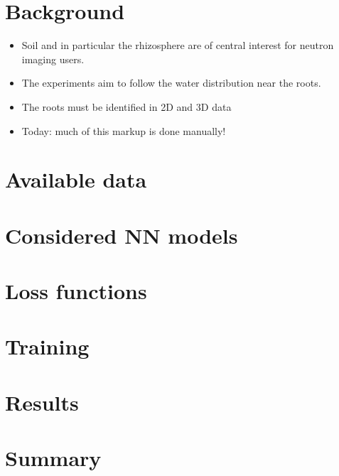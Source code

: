 \documentclass[letterpaper,10pt,english]{sphinxmanual}
\begin{document}
\section{Background}
\label{\detokenize{ML4NeutronImageSegmentation:background}}\begin{itemize}
\item {} 
Soil and in particular the rhizosphere are of central interest for neutron imaging users.

\item {} 
The experiments aim to follow the water distribution near the roots.

\item {} 
The roots must be identified in 2D and 3D data

\item {} 
Today: much of this mark\sphinxhyphen{}up is done manually!

\end{itemize}


\section{Available data}
\label{\detokenize{ML4NeutronImageSegmentation:available-data}}

\section{Considered NN models}
\label{\detokenize{ML4NeutronImageSegmentation:considered-nn-models}}

\section{Loss functions}
\label{\detokenize{ML4NeutronImageSegmentation:loss-functions}}

\section{Training}
\label{\detokenize{ML4NeutronImageSegmentation:training}}

\section{Results}
\label{\detokenize{ML4NeutronImageSegmentation:results}}

\section{Summary}
\label{\detokenize{ML4NeutronImageSegmentation:summary}}
\end{document}
